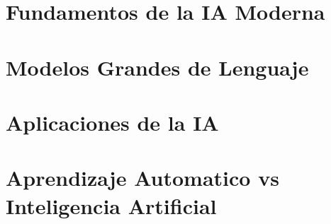 \section{Fundamentos de la IA Moderna}


\section{Modelos Grandes de Lenguaje}

\section{Aplicaciones de la IA}

\section{Aprendizaje Automatico vs Inteligencia Artificial}
